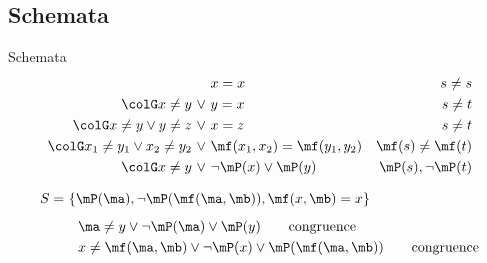 \subsection{Schemata}

\begin{frame}
	\begin{block}{Schemata}
		\vspace{-1em}
		\begin{align*}		
			&x=x &s\neq s
			\\
			{\colG x\neq y\ \lor}\ 
				&y=x &s \neq t
			\\
			{\colG x\neq y \lor y\neq z\ \lor}\ 
				&x=z &s\neq t
			\\
			{\colG x_1\neq y_1 \lor x_2\neq y_2 \ \lor}\ 
			&\mf(x_1,x_2) = \mf(y_1,y_2) 
				&\mf(s)\neq\mf(t)
			\\
		    {\colG x\neq y\ \lor}\ &\lnot\mP(x) \lor \mP(y) 
			    &\mP(s), \lnot\mP(t)
			\end{align*}
		\end{block}
%		
		\begin{example}
			\vspace{-1em}
			\begin{align*}
			S =&\ \{ \mP(\ma), \lnot\mP(\mf(\ma,\mb)), \mf(x,\mb)= x \} 
			\\[0.5em]
&\quad \ma\neq y \lor \lnot \mP(\ma) \lor \mP(y) \tag*{congruence}\\
&\quad x\neq \mf(\ma,\mb) \lor \lnot \mP(x) \lor \mP(\mf(\ma,\mb)) \tag*{congruence}
\end{align*}
			\end{example}
			
			\end{frame}